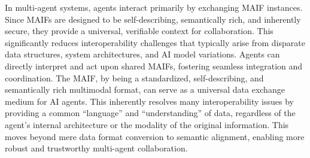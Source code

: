 \documentclass[conference]{IEEEtran}
\begin{document}
In multi-agent systems, agents interact primarily by exchanging MAIF instances. Since MAIFs are designed to be self-describing, semantically rich, and inherently secure, they provide a universal, verifiable context for collaboration. This significantly reduces interoperability challenges that typically arise from disparate data structures, system architectures, and AI model variations\cite{ref29}. Agents can directly interpret and act upon shared MAIFs, fostering seamless integration and coordination. The MAIF, by being a standardized, self-describing, and semantically rich multimodal format, can serve as a universal data exchange medium for AI agents. This inherently resolves many interoperability issues by providing a common ``language'' and ``understanding'' of data, regardless of the agent's internal architecture or the modality of the original information. This moves beyond mere data format conversion to semantic alignment, enabling more robust and trustworthy multi-agent collaboration.
\end{document}
